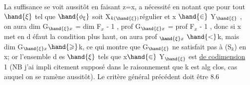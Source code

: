 La suffisance se voit aussitôt en faisant z=x, a nécessité   en
notant que pour tout $\hand{\xi}$ tel que $\hand{\phi_\xi}$ soit X$_{k(\hand{\xi})}$\hand{\unsure{$-$|$+$}}régulier et x $\hand{\in}$ Y$_{\hand{\xi}}$ ,
on aura dim G$_{\hand{\xi} x}$ = dim F$_x$ - 1 , prof G$_{\hand{\xi} x}$ = prof F$_x$ - 1 , donc si
x met en d éfaut la condition plus haut, on aura prof $_{\hand{\xi} x}$ $\hand{<}$k, mais
dim G$_{\hand{\xi} x}$$\hand{\geqslant}$k, ce qui montre que G$_{\hand{\xi}}$ ne satisfait pas à (S$_k$) en x; or
l'ensemble d es $\hand{\xi}$ tels que x$\hand{\in}$ Y$_{\hand{\xi}}$ est \uline{de codimension} 1 (NB j'ai impli
\margin{|} citement supposé dans le raisonnement que k est alg clos, cas auquel on
se ramène aussitôt). Le critère général précédent doit être   8.6
